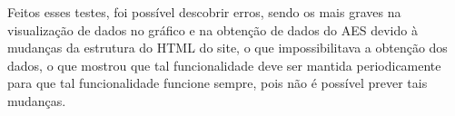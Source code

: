 Feitos esses testes, foi possível descobrir erros, sendo os mais graves na visualização de dados no gráfico e na obtenção de dados do AES devido à mudanças da estrutura do HTML do site, o que impossibilitava a obtenção dos dados, o que mostrou que tal funcionalidade deve ser mantida periodicamente para que tal funcionalidade funcione sempre, pois não é possível prever tais mudanças.